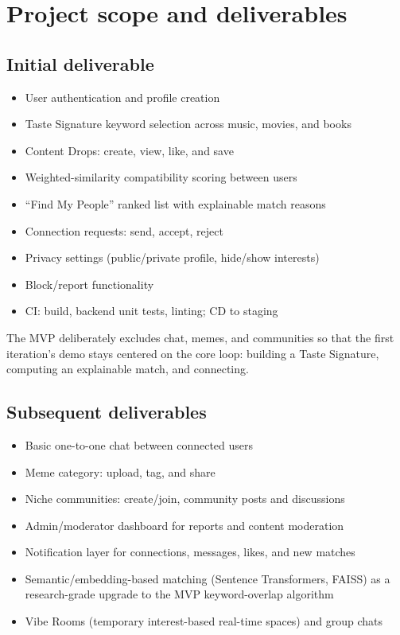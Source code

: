\documentclass[11pt,a4paper]{article}
\begin{document}
\section{Project scope and deliverables}
\subsection{Initial deliverable}
\begin{itemize}[leftmargin=0.7cm]
    \item User authentication and profile creation
    \item Taste Signature keyword selection across music, movies, and books
    \item Content Drops: create, view, like, and save
    \item Weighted-similarity compatibility scoring between users
    \item ``Find My People'' ranked list with explainable match reasons
    \item Connection requests: send, accept, reject
    \item Privacy settings (public/private profile, hide/show interests)
    \item Block/report functionality
    \item CI: build, backend unit tests, linting; CD to staging
\end{itemize}
The MVP deliberately excludes chat, memes, and communities so that the first iteration's demo
stays centered on the core loop: building a Taste Signature, computing an explainable match, and
connecting.

\subsection{Subsequent deliverables}
\begin{itemize}[leftmargin=0.7cm]
    \item Basic one-to-one chat between connected users
    \item Meme category: upload, tag, and share
    \item Niche communities: create/join, community posts and discussions
    \item Admin/moderator dashboard for reports and content moderation
    \item Notification layer for connections, messages, likes, and new matches
    \item Semantic/embedding-based matching (Sentence Transformers, FAISS) as a research-grade upgrade to the MVP keyword-overlap algorithm
    \item Vibe Rooms (temporary interest-based real-time spaces) and group chats
\end{itemize}
\end{document}

